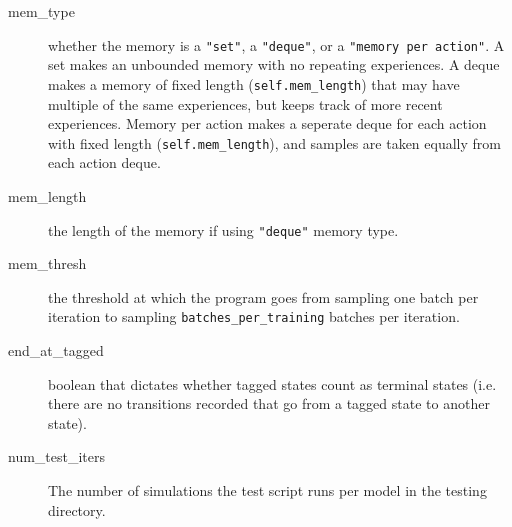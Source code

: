 \documentclass[onecolumn,letterpaper,11pt]{article}
\begin{document}
\begin{description}
	\item[mem\_type] whether the memory is a \texttt{"set"}, a \texttt{"deque"}, or a \texttt{"memory per action"}. A set makes an unbounded memory with no repeating experiences. A deque makes a memory of fixed length (\texttt{self.mem\_length}) that may have multiple of the same experiences, but keeps track of more recent experiences. Memory per action makes a seperate deque for each action with fixed length (\texttt{self.mem\_length}), and samples are taken equally from each action deque.
	
	\item[mem\_length] the length of the memory if using \texttt{"deque"} memory type.
	
	\item[mem\_thresh] the threshold at which the program goes from sampling one batch per iteration to sampling \texttt{batches\_per\_training} batches per iteration.
	
	\item[end\_at\_tagged] boolean that dictates whether tagged states count as terminal states (i.e. there are no transitions recorded that go from a tagged state to another state).
	
	\item[num\_test\_iters] The number of simulations the test script runs per model in the testing directory.
	
\end{description}
\end{document}
